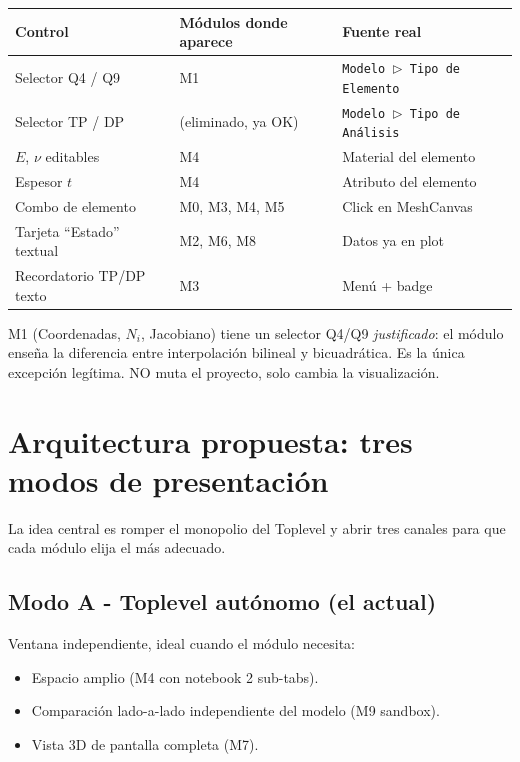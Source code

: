 \documentclass[11pt,a4paper]{article}
\begin{document}
\begin{center}
\renewcommand{\arraystretch}{1.2}
\begin{tabular}{@{}l l l@{}}
\toprule
\textbf{Control} & \textbf{Módulos donde aparece} & \textbf{Fuente real} \\
\midrule
Selector Q4 / Q9 & M1 & \texttt{Modelo\,$\triangleright$\,Tipo de Elemento} \\
Selector TP / DP & (eliminado, ya OK) & \texttt{Modelo\,$\triangleright$\,Tipo de Análisis} \\
$E$, $\nu$ editables & M4 & Material del elemento \\
Espesor $t$ & M4 & Atributo del elemento \\
Combo de elemento & M0, M3, M4, M5 & Click en MeshCanvas \\
Tarjeta ``Estado'' textual & M2, M6, M8 & Datos ya en plot \\
Recordatorio TP/DP texto & M3 & Menú + badge \\
\bottomrule
\end{tabular}
\end{center}
\vspace{0.4cm}

\begin{warnBox}
M1 (Coordenadas, $N_i$, Jacobiano) tiene un selector Q4/Q9 \emph{justificado}:
el módulo enseña la diferencia entre interpolación bilineal y bicuadrática.
Es la única excepción legítima. NO muta el proyecto, solo cambia la
visualización.
\end{warnBox}

\section{Arquitectura propuesta: tres modos de presentación}

La idea central es romper el monopolio del Toplevel y abrir tres canales
para que cada módulo elija el más adecuado.

\subsection{Modo A - Toplevel autónomo (el actual)}

Ventana independiente, ideal cuando el módulo necesita:
\begin{itemize}[leftmargin=1.2em, itemsep=2pt]
  \item Espacio amplio (M4 con notebook 2 sub-tabs).
  \item Comparación lado-a-lado independiente del modelo (M9 sandbox).
  \item Vista 3D de pantalla completa (M7).
\end{itemize}
\end{document}
